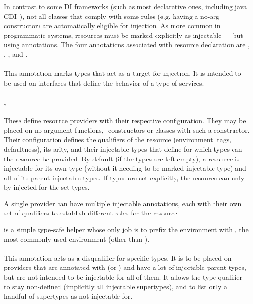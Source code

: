 	In contrast to some DI frameworks (such as most declarative ones, including java CDI~\cite{CdiInjectable}), not all classes that comply with some rules (e.g. having a no-arg constructor) are automatically eligible for injection. As more common in programmatic systems, resources must be marked explicitly as injectable --- but using annotations.
	The four annotations associated with resource declaration are , , , and .

		\paragraph{} This annotation marks types that act as a target for injection. It is intended to be used on interfaces that define the behavior of a type of services.
		
		\paragraph{, } These define resource providers with their respective configuration. They may be placed on no-argument functions, -constructors or classes with such a constructor. Their configuration defines the qualifiers of the resource (environment, tags, defaultness), its arity, and their injectable types that define for which types can the resource be provided. By default (if the types are left empty), a resource is injectable for its own type (without it needing to be marked injectable type) and all of its parent injectable types. If types are set explicitly, the resource can only by injected for the set types.
		
		A single provider can have multiple injectable annotations, each with their own set of qualifiers to establish different roles for the resource.
		
		 is a simple type-safe helper whose only job is to prefix the environment with , the most commonly used environment (other than ).

		\paragraph{} This annotation	acts as a disqualifier for specific types. It is to be placed on providers that are annotated with  (or ) and have a lot of injectable parent types, but are not intended to be injectable for all of them. It allows the type qualifier to stay non-defined (implicitly all injectable supertypes), and to list only a handful of supertypes as not injectable for.

